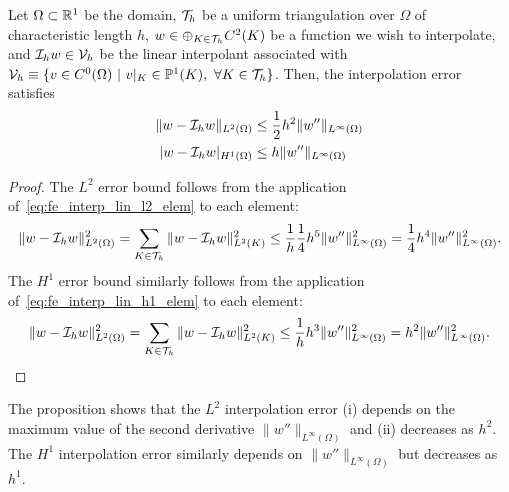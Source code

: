\begin{proposition}
  Let $\Omega \subset \mathbb{R}^1$ be the domain, $\mathcal{T}_h$ be a uniform triangulation over $\Omega$ of characteristic length $h$, $w \in \oplus_{K \in \mathcal{T}_h}  C^2(K)$ be a function we wish to interpolate, and $\mathcal{I}_h w \in \mathcal{V}_h$ be the linear interpolant associated with $\mathcal{V}_h \equiv \{ v \in C^0(\Omega) \ | \ v|_K \in \mathbb{P}^1(K), \ \forall K \in \mathcal{T}_h \}$. Then, the interpolation error satisfies
  \begin{align}
    \| w - \mathcal{I}_h w \|_{L^2(\Omega)} &\leq \frac{1}{2} h^2 \| w'' \|_{L^\infty(\Omega)} \label{eq:fe_interp_lin_l2} \\
    | w - \mathcal{I}_h w |_{H^1(\Omega)} &\leq h \| w'' \|_{L^\infty(\Omega)} \label{eq:fe_interp_lin_h1}
  \end{align}
  \begin{proof}
    The $L^2$ error bound follows from the application of~\eqref{eq:fe_interp_lin_l2_elem} to each element:
    \begin{equation*}
      \| w - \mathcal{I}_h w \|^2_{L^2(\Omega)}
      =
      \sum_{K \in \mathcal{T}_h} \| w - \mathcal{I}_h w \|^2_{L^2(K)}
      \leq
      \frac{1}{h} \frac{1}{4} h^5 \| w'' \|_{L^\infty(\Omega)}^2
      = \frac{1}{4} h^4 \| w'' \|_{L^\infty(\Omega)}^2.
    \end{equation*}
    The $H^1$ error bound similarly follows from the application of~\eqref{eq:fe_interp_lin_h1_elem} to each element:
        \begin{equation*}
      \| w - \mathcal{I}_h w \|^2_{L^2(\Omega)}
      =
      \sum_{K \in \mathcal{T}_h} \| w - \mathcal{I}_h w \|^2_{L^2(K)}
      \leq
      \frac{1}{h} h^3 \| w'' \|_{L^\infty(\Omega)}^2
      = h^2 \| w'' \|_{L^\infty(\Omega)}^2.
    \end{equation*}
  \end{proof}
\end{proposition}
The proposition shows that the $L^2$ interpolation error (i) depends on the maximum value of the second derivative $\| w '' \|_{L^\infty(\Omega)}$ and (ii) decreases as $h^2$.  The $H^1$ interpolation error similarly depends on $\| w'' \|_{L^\infty(\Omega)}$ but decreases as $h^1$. 

